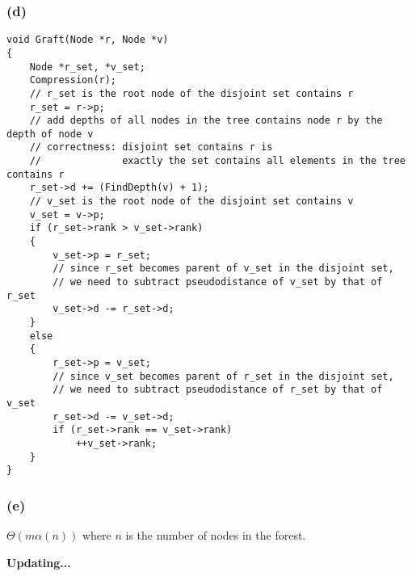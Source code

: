 \subsubsection*{(d)}

\begin{verbatim}
void Graft(Node *r, Node *v)
{
    Node *r_set, *v_set;
    Compression(r);
    // r_set is the root node of the disjoint set contains r
    r_set = r->p;
    // add depths of all nodes in the tree contains node r by the depth of node v
    // correctness: disjoint set contains r is 
    //              exactly the set contains all elements in the tree contains r  
    r_set->d += (FindDepth(v) + 1);
    // v_set is the root node of the disjoint set contains v
    v_set = v->p;
    if (r_set->rank > v_set->rank)
    {
        v_set->p = r_set;
        // since r_set becomes parent of v_set in the disjoint set,
        // we need to subtract pseudodistance of v_set by that of r_set
        v_set->d -= r_set->d;
    }
    else
    {
        r_set->p = v_set;
        // since v_set becomes parent of r_set in the disjoint set,
        // we need to subtract pseudodistance of r_set by that of v_set
        r_set->d -= v_set->d;
        if (r_set->rank == v_set->rank)
            ++v_set->rank;
    }
}
\end{verbatim}

\subsubsection*{(e)}

$\Theta(m \alpha(n))$ where $n$ is the number of nodes in the forest.

\centerline{\textbf{Updating...}}

